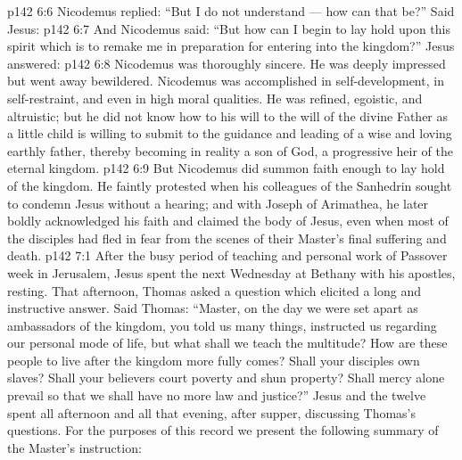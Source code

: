 \vs p142 6:6 Nicodemus replied: “But I do not understand --- how can that be?” Said Jesus: 
\vs p142 6:7 And Nicodemus said: “But how can I begin to lay hold upon this spirit which is to remake me in preparation for entering into the kingdom?” Jesus answered: 
\vs p142 6:8 Nicodemus was thoroughly sincere. He was deeply impressed but went away bewildered. Nicodemus was accomplished in self\hyp{}development, in self\hyp{}restraint, and even in high moral qualities. He was refined, egoistic, and altruistic; but he did not know how to  his will to the will of the divine Father as a little child is willing to submit to the guidance and leading of a wise and loving earthly father, thereby becoming in reality a son of God, a progressive heir of the eternal kingdom.
\vs p142 6:9 But Nicodemus did summon faith enough to lay hold of the kingdom. He faintly protested when his colleagues of the Sanhedrin sought to condemn Jesus without a hearing; and with Joseph of Arimathea, he later boldly acknowledged his faith and claimed the body of Jesus, even when most of the disciples had fled in fear from the scenes of their Master’s final suffering and death.
\vs p142 7:1 After the busy period of teaching and personal work of Passover week in Jerusalem, Jesus spent the next Wednesday at Bethany with his apostles, resting. That afternoon, Thomas asked a question which elicited a long and instructive answer. Said Thomas: “Master, on the day we were set apart as ambassadors of the kingdom, you told us many things, instructed us regarding our personal mode of life, but what shall we teach the multitude? How are these people to live after the kingdom more fully comes? Shall your disciples own slaves? Shall your believers court poverty and shun property? Shall mercy alone prevail so that we shall have no more law and justice?” Jesus and the twelve spent all afternoon and all that evening, after supper, discussing Thomas’s questions. For the purposes of this record we present the following summary of the Master’s instruction:
